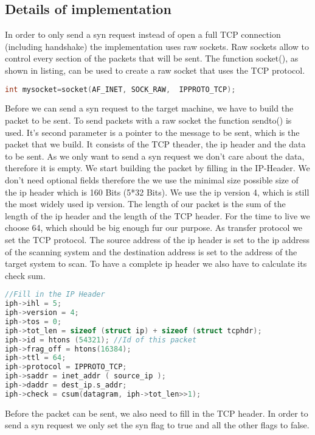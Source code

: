 \subsection{Details of implementation}
In order to only send a syn request instead of open a full TCP connection (including handshake) the implementation uses raw sockets. Raw sockets allow to control
every section of the packets that will be sent. The function socket(), as shown in listing, can be used to create a raw socket that uses the TCP protocol.
\begin{lstlisting}[frame= single, language=C, caption= C code to use the connect() to check if port is open]
int mysocket=socket(AF_INET, SOCK_RAW,  IPPROTO_TCP);
\end{lstlisting}
Before we can send a syn request to the target machine, we have to build the packet to be sent. To send packets with a raw socket the function sendto() is used.
It's second parameter is a pointer to the message to be sent, which 
is the packet that we build. It consists of the TCP theader, the ip header and the data
to be sent. As we only want to send a syn request we don't care about the data, therefore it is empty. We start building the packet by filling in the IP-Header. We don't need optional fields therefore the we use the minimal size possible size of the ip header which is 160 Bits (5*32 Bits). We use the ip version 4, which is still the most widely used ip version. The length of our packet
is the sum of the length of the ip header and the length of the TCP header. For the time to live we choose 64, which should be big enough
fur our purpose. As transfer protocol we set the TCP protocol. The source address of the ip header is set to the ip address of the scanning system and the destination address is set to the address of the target system to scan. To have a complete ip header we also
have to calculate its check sum.
\begin{lstlisting}[frame= single, language=C, caption= C code to fill in ip header]
//Fill in the IP Header
iph->ihl = 5;
iph->version = 4;
iph->tos = 0;
iph->tot_len = sizeof (struct ip) + sizeof (struct tcphdr);
iph->id = htons (54321); //Id of this packet
iph->frag_off = htons(16384);
iph->ttl = 64;
iph->protocol = IPPROTO_TCP;
iph->saddr = inet_addr ( source_ip );   
iph->daddr = dest_ip.s_addr;
iph->check = csum(datagram, iph->tot_len>>1);
\end{lstlisting}
Before the packet can be sent, we also need to fill in the TCP header. In order to send a syn request we only set the syn flag to true and all the other flags to false.

